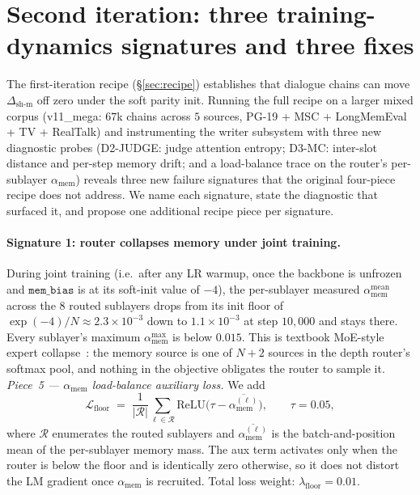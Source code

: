 \documentclass{article}
\newcommand{\dsh}{\Delta_{\text{sh-m}}}
\newcommand{\amem}{\alpha_{\text{mem}}}
\begin{document}
\section{Second iteration: three training-dynamics signatures and three fixes}
\label{sec:second_iteration}

The first-iteration recipe (\S\ref{sec:recipe}) establishes that
dialogue chains can move $\dsh$ off zero under the soft parity
init. Running the full recipe on a larger mixed corpus
(v11\_mega: $67$k chains across $5$ sources, PG-19 + MSC +
LongMemEval + TV + RealTalk) and instrumenting the writer
subsystem with three new diagnostic probes (D2-JUDGE:
judge attention entropy; D3-MC: inter-slot distance and per-step
memory drift; and a load-balance trace on the router's
per-sublayer $\amem$) reveals three new failure signatures that
the original four-piece recipe does not address. We name each
signature, state the diagnostic that surfaced it, and propose one
additional recipe piece per signature.

\paragraph{Signature 1: router collapses memory under joint training.}
During joint training (i.e.\ after any LR warmup, once the backbone
is unfrozen and $\texttt{mem\_bias}$ is at its soft-init value of
$-4$), the per-sublayer measured $\amem^{\text{mean}}$ across the
$8$ routed sublayers drops from its init floor of $\exp(-4)/N
\approx 2.3\!\times\!10^{-3}$ down to $1.1\!\times\!10^{-3}$ at
step $10{,}000$ and stays there. Every sublayer's maximum
$\amem^{\text{max}}$ is below $0.015$. This is textbook MoE-style
expert collapse~\cite{fedus2021switch}: the memory source is one
of $N\!+\!2$ sources in the depth router's softmax pool, and
nothing in the objective obligates the router to sample it.
\emph{Piece~5 --- $\amem$ load-balance auxiliary loss.} We add
\[
\mathcal{L}_{\text{floor}}
 \;=\; \frac{1}{|\mathcal{R}|}\sum_{\ell \in \mathcal{R}}
        \mathrm{ReLU}\!\bigl(\tau - \overline{\amem^{(\ell)}}\bigr),
\qquad \tau = 0.05,
\]
where $\mathcal{R}$ enumerates the routed sublayers and
$\overline{\amem^{(\ell)}}$ is the batch-and-position mean of the
per-sublayer memory mass. The aux term activates only when the
router is below the floor and is identically zero otherwise, so it
does not distort the LM gradient once $\amem$ is recruited. Total
loss weight: $\lambda_{\text{floor}} = 0.01$.
\end{document}
